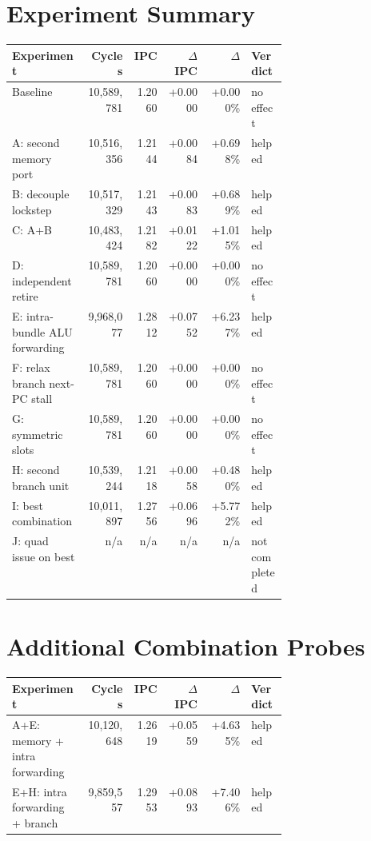 \documentclass[10pt]{article}
\begin{document}
\section*{Experiment Summary}

\begin{longtable}{@{}p{0.27\linewidth}rrrrp{0.13\linewidth}@{}}
\toprule
Experiment & Cycles & IPC & $\Delta$ IPC & $\Delta$ & Verdict \\
\midrule
\endhead
Baseline & 10,589,781 & 1.2060 & +0.0000 & +0.000\% & no effect \\
A: second memory port & 10,516,356 & 1.2144 & +0.0084 & +0.698\% & helped \\
B: decouple lockstep & 10,517,329 & 1.2143 & +0.0083 & +0.689\% & helped \\
C: A+B & 10,483,424 & 1.2182 & +0.0122 & +1.015\% & helped \\
D: independent retire & 10,589,781 & 1.2060 & +0.0000 & +0.000\% & no effect \\
E: intra-bundle ALU forwarding & 9,968,077 & 1.2812 & +0.0752 & +6.237\% & helped \\
F: relax branch next-PC stall & 10,589,781 & 1.2060 & +0.0000 & +0.000\% & no effect \\
G: symmetric slots & 10,589,781 & 1.2060 & +0.0000 & +0.000\% & no effect \\
H: second branch unit & 10,539,244 & 1.2118 & +0.0058 & +0.480\% & helped \\
I: best combination & 10,011,897 & 1.2756 & +0.0696 & +5.772\% & helped \\
J: quad issue on best & n/a & n/a & n/a & n/a & not completed \\
\bottomrule
\end{longtable}

\section*{Additional Combination Probes}

\begin{longtable}{@{}p{0.27\linewidth}rrrrp{0.13\linewidth}@{}}
\toprule
Experiment & Cycles & IPC & $\Delta$ IPC & $\Delta$ & Verdict \\
\midrule
\endhead
A+E: memory + intra forwarding & 10,120,648 & 1.2619 & +0.0559 & +4.635\% & helped \\
E+H: intra forwarding + branch & 9,859,557 & 1.2953 & +0.0893 & +7.406\% & helped \\
\bottomrule
\end{longtable}
\end{document}
